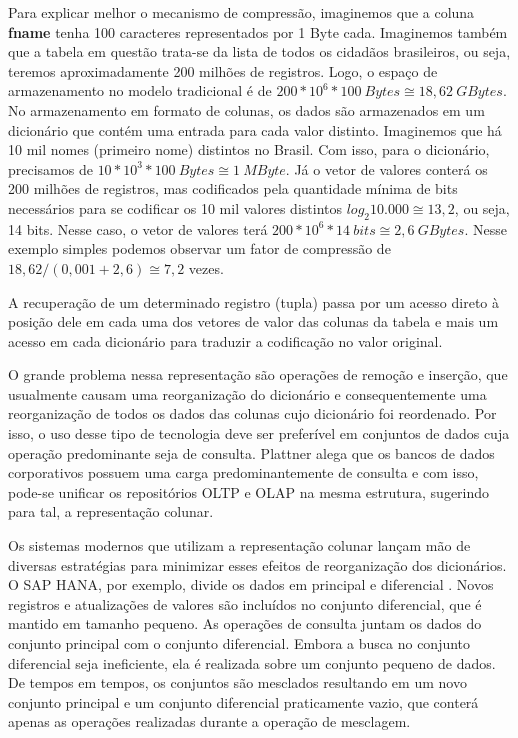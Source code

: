 Para explicar melhor o mecanismo de compressão, imaginemos que a coluna \textbf{fname} tenha 
100 caracteres representados por 1 Byte cada. Imaginemos também que a tabela em questão trata-se 
da lista de todos os cidadãos brasileiros, ou seja, teremos aproximadamente 200 milhões de registros. 
Logo, o espaço de armazenamento no modelo tradicional é de $200*10^6 * 100~Bytes \cong 18,62~GBytes$. 
No armazenamento em formato de colunas, os dados são armazenados em um dicionário que contém uma 
entrada para cada valor distinto. Imaginemos que há 10 mil nomes (primeiro nome) distintos no Brasil. 
Com isso, para o dicionário, precisamos de $10*10^3 * 100~Bytes \cong 1~MByte$. Já o vetor de 
valores conterá os 200 milhões de registros, mas codificados pela quantidade mínima de bits 
necessários para se codificar os 10 mil valores distintos $log_2 10.000 \cong 13,2$, ou seja, 
14 bits. Nesse caso, o vetor de valores terá $200*10^6 * 14~bits \cong 2,6~GBytes$. Nesse exemplo simples 
podemos observar um fator de compressão de $18,62 / (0,001 + 2,6) \cong 7,2$ vezes.

A recuperação de um determinado registro (tupla) passa por um acesso direto à posição dele em 
cada uma dos vetores de valor das colunas da tabela e mais um acesso em cada dicionário para traduzir 
a codificação no valor original.

O grande problema nessa representação são operações de remoção e inserção, que usualmente causam uma 
reorganização do dicionário e consequentemente uma reorganização de todos os dados das colunas cujo 
dicionário foi reordenado. Por isso, o uso desse tipo de tecnologia deve ser preferível em conjuntos 
de dados cuja operação predominante seja de consulta. Plattner \citep{plattner2009common} alega que 
os bancos de dados corporativos possuem uma carga predominantemente de consulta e com isso, 
pode-se unificar os repositórios OLTP e OLAP na mesma estrutura, sugerindo para tal, a representação colunar. 

Os sistemas modernos que utilizam a representação colunar lançam mão de diversas estratégias para 
minimizar esses efeitos de reorganização dos dicionários. O SAP HANA, por exemplo, divide os dados 
em principal e diferencial \citep{plattner2012memory}. Novos registros e atualizações de valores são 
incluídos no conjunto diferencial, que é mantido em tamanho pequeno. As operações de consulta juntam 
os dados do conjunto principal com o conjunto diferencial. Embora a busca no conjunto diferencial seja 
ineficiente, ela é realizada sobre um conjunto pequeno de dados. De tempos em tempos, os conjuntos são 
mesclados resultando em um novo conjunto principal e um conjunto diferencial praticamente vazio, que 
conterá apenas as operações realizadas durante a operação de mesclagem. 

